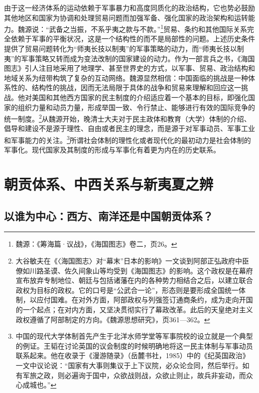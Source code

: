 \documentclass[a4paper, 12pt, openright]{ctexbook}
\begin{document}
由于这一经济体系的运动依赖于军事暴力和高度同质化的政治结构，它也势必鼓励其他地区和国家为协调和处理贸易问题而加强军备、强化国家的政治架构和运转能力。魏源说：“武备之当振，不系乎夷之款与不款。”\footnote{魏源：《筹海篇·议战》，《海国图志》卷二，页26。}贸易、条约和其他国际关系完全依赖于军事的平衡状况，这是一个结构性的而不是局部性的问题。上述历史条件提供了贸易问题转化为“师夷长技以制夷”的军事策略的动力，而“师夷长技以制夷”的军事策略又转而成为变法改制的国家建设的动力。作为一部言兵之书，《海国图志》引人注目地采用了地理学、甚至世界史的方式，以军事、贸易、政治结构和地域关系为纽带构筑了复杂的互动网络。魏源显然相信：中国面临的挑战是一种体系性的、结构性的挑战，因而无法局限于具体的战争和贸易来理解和回应这一挑战。他对美国和其他西方国家的民主制度的介绍适应着一个基本的目标，即强化国家的组织力量和动员力量，形成举国一致、令行禁止、能够进行有效的国际竞争的统一制度。\footnote{大谷敏夫在《〈海国图志〉对“幕末”日本的影响》一文谈到阿部正弘政府中臣僚如川路圣谟、佐久间象山等均受到《海国图志》的影响。这个政权是在幕府宣布放弃专制地位、朝廷与包括诸藩在内的各种势力相结合之后，以建立联合政权为目标的政权。它的口号是“公武合一论”，形态则是要形成全国统一体制，以应付国难。在对外方面，阿部政权与列强签订通商条约，成为走向开国的一个起点；在对内方面，又坚决贯彻实行了幕政改革。此后的天皇绝对主义政权遵循了阿部制定的方向。《魏源思想研究》，页361—362。}从魏源开始，晚清士大夫对于民主政体和教育（大学）体制的介绍、倡导和建设不是源于理性、自由或者民主的理念，而是源于对军事动员、军事工业和军事能力的关注。\footnote{中国的现代大学体制首先产生于北洋水师学堂等军事院校的设立就是一个典型的例证。王韬在讨论英国的议会制度的时候明确地将这一民主体制与军事动员联系起来。他在收录于《漫游随录》（岳麓书社，1985）中的《纪英国政治》一文中议论说：“国家有大事则集议于上下议院，必众论佥同，然后举行。如有军旅之政，则必遍询于国中，众欲战则战，众欲止则止，故兵非妄动，而众心成城也。”}所谓社会体制的理性化或者现代化的最初动力是社会体制的军事化。现代国家及其制度的形成与军事化有着更为内在的历史联系。

\section{朝贡体系、中西关系与新夷夏之辨}

\subsection{以谁为中心：西方、南洋还是中国朝贡体系？}
\end{document}
